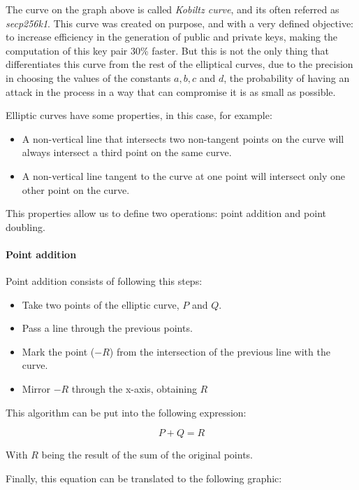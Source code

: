 \documentclass{article}
\begin{document}
The curve on the graph above is called \textit{Kobiltz curve}, and its often referred as \textit{secp256k1}. This curve was created on purpose, and with a very defined objective: to increase efficiency in the generation of public and private keys, making the computation of this key pair 30\% faster. But this is not the only thing that differentiates this curve from the rest of the elliptical curves, due to the precision in choosing the values of the constants \(a, b, c\) and \(d\), the probability of having an attack in the process in a way that can compromise it is as small as possible.

Elliptic curves have some properties, in  this case, for example:

\begin{itemize}
    \item A non-vertical line that intersects two non-tangent points on the curve will always intersect a third point on the same curve.
    \item A non-vertical line tangent to the curve at one point will intersect only one other point on the curve.
\end{itemize}

This properties allow us to define two operations: point addition and point doubling.

\paragraph{Point addition}

Point addition consists of following this steps:

\begin{itemize}
    \item Take two points of the elliptic curve, \(P\) and \(Q\).
    \item Pass a line through the previous points.
    \item Mark the point (\(-R\)) from the intersection of the previous line with the curve.
    \item Mirror \(-R\) through the x-axis, obtaining \(R\)
\end{itemize}

This algorithm can be put into the following expression:

\[P + Q = R\]

With \(R\) being the result of the sum of the original points.

Finally, this equation can be translated to the following graphic:
\end{document}
